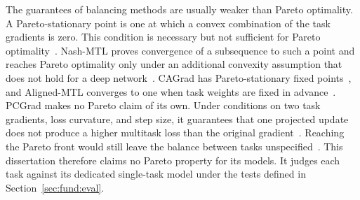 The guarantees of balancing methods are usually weaker than Pareto optimality. A
Pareto-stationary point is one at which a convex combination of the task gradients is
zero. This condition is necessary but not sufficient for Pareto
optimality~\cite{nash}. Nash-MTL proves convergence of a subsequence to such a point
and reaches Pareto optimality only under an additional convexity assumption that does
not hold for a deep network~\cite{nash}. CAGrad has Pareto-stationary fixed
points~\cite{liu2021cagrad}, and Aligned-MTL converges to one when task weights are
fixed in advance~\cite{senushkin2023aligned}. PCGrad makes no Pareto claim of its own. Under
conditions on two task gradients, loss curvature, and step size, it guarantees that
one projected update does not produce a higher multitask loss than the original
gradient~\cite{yu2020pcgrad}. Reaching the Pareto front would still leave the balance
between tasks unspecified~\cite{liu2021cagrad,senushkin2023aligned}. This
dissertation therefore claims no Pareto property for its models. It judges each task
against its dedicated single-task model under the tests defined in
Section~\ref{sec:fund:eval}.

